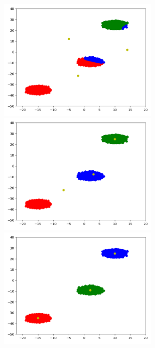 \begin{center}
\includegraphics[width=0.6\textwidth]{../images/before_kmeans.png}\\
\includegraphics[width=0.6\textwidth]{../images/first_iteration.png}\\
\includegraphics[width=0.6\textwidth]{../images/after_kmeans.png}\\
\end{center}




